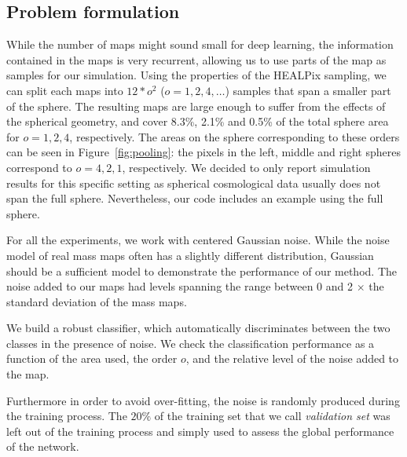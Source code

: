 \documentclass[final,twocolumn,3p,times,authoryear]{elsarticle}
\newcommand{\figref}[1]{Figure~\ref{fig:#1}}
\newcommand{\1}{\b{1}}              %
\newcommand{\0}{\b{0}}              %
\begin{document}
\subsection{Problem formulation}
While the number of maps might sound small for deep learning, the information contained in the maps is very recurrent, allowing us to use parts of the map as samples for our simulation.
Using the properties of the HEALPix sampling, we can split each maps into $12*o^2$ ($o=1,2,4,\dots$) samples that span a smaller part of the sphere.
The resulting maps are large enough to suffer from the effects of the spherical geometry, and cover 8.3\%, 2.1\% and 0.5\% of the total sphere area for $o=1,2,4$, respectively.
The areas on the sphere corresponding to these orders can be seen in \figref{pooling}: the pixels in the left, middle and right spheres correspond to $o=4,2,1$, respectively.
We decided to only report simulation results for this specific setting as spherical cosmological data usually does not span the full sphere.
Nevertheless, our code includes an example using the full sphere.

For all the experiments, we work with centered Gaussian noise.
While the noise model of real mass maps often has a slightly different distribution, Gaussian should be a sufficient model to demonstrate the performance of our method.
The noise added to our maps had levels spanning the range between 0 and 2  $\times$ the standard deviation of the mass maps.

We build a robust classifier, which automatically discriminates between the two classes in the presence of noise.
We check the classification performance as a function of the area used, the order $o$, and the relative level of the noise added to the map.

Furthermore in order to avoid over-fitting, the noise is randomly produced during the training process.
The $20\%$ of the training set that we call \emph{validation set} was left out of the training process and simply used to assess the global performance of the network.
\end{document}
